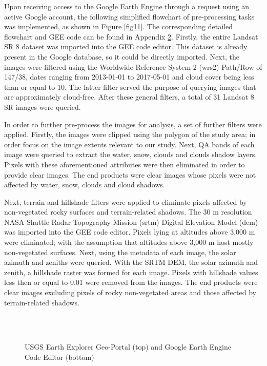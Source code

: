 \justify
Upon receiving access to the Google Earth Engine through a request using an active Google account, the following simplified flowchart of pre-processing tasks was implemented, as shown in Figure \ref{fig11}. The corresponding detailed flowchart and GEE code can be found in Appendix \hyperref[app1]{2}. Firstly, the entire Landsat SR 8 dataset was imported into the GEE code editor. This dataset is already present in the Google database, so it could be directly imported. Next, the images were filtered using the Worldwide Reference System 2 (\ac{wrs}2) Path/Row of 147/38, dates ranging from 2013-01-01 to 2017-05-01 and cloud cover being less than or equal to 10. The latter filter served the purpose of querying images that are approximately cloud-free. After these general filters, a total of 31 Landsat 8 SR images were queried. 

\justify
In order to further pre-process the images for analysis, a set of further filters were applied. Firstly, the images were clipped using the polygon of the study area; in order focus on the image extents relevant to our study. Next, QA bands of each image were queried to extract the water, snow, clouds and clouds shadow layers. Pixels with these aforementioned attributes were then eliminated in order to provide clear images. The end products were clear images whose pixels were not affected by water, snow, clouds and cloud shadows.

\justify
Next, terrain and hillshade filters were applied to eliminate pixels affected by non-vegetated rocky surfaces and terrain-related shadows. The 30 m resolution NASA Shuttle Radar Topography Mission (\ac{srtm}) Digital Elevation Model (\ac{dem}) was imported into the GEE code editor. Pixels lying at altitudes above 3,000 m were eliminated; with the assumption that altitudes above 3,000 m host mostly non-vegetated surfaces. Next, using the metadata of each image, the solar azimuth and zeniths were queried. With the SRTM DEM, the solar azimuth and zenith, a hillshade raster was formed for each image. Pixels with hillshade values less then or equal to 0.01 were removed from the images. The end products were clear images excluding pixels of rocky non-vegetated areas and those affected by terrain-related shadows.

\begin{figure}[H]
	\centering
	{
	\setlength{\fboxsep}{1pt}%
	\setlength{\fboxrule}{0.01pt}%
	\fbox{\texttt{[image: EE\_1]}} \\
	\vspace{0.3cm}
	 \\
    }
	\vspace{0.2cm}
	\caption{USGS Earth Explorer Geo-Portal (top) and Google Earth Engine Code Editor (bottom)}\label{fig10}
\end{figure}
\vspace{-12pt}

